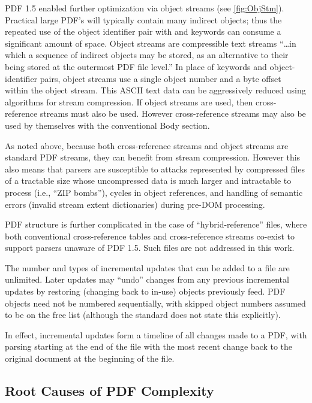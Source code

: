 PDF 1.5 enabled further optimization via object streams (see
\cref{fig:ObjStm}).
%
Practical large PDF's will typically contain many indirect objects;
%
thus the repeated use of the object identifier pair with 
and  keywords can consume a significant amount of space.
%
Object streams are compressible text streams ``\ldots in which a
sequence of indirect objects may be stored, as an alternative to their
being stored at the outermost PDF file level.''
%
In place of keywords and object-identifier pairs, object streams use a
single object number and a byte offset within the object stream.
%
This ASCII text data can be aggressively reduced using algorithms for
stream compression.
%
If object streams are used, then cross-reference streams must also be
used.
%
However cross-reference streams may also be used by themselves with
the conventional Body section.

As noted above, because both cross-reference streams and object
streams are standard PDF streams, they can benefit from stream
compression. However this also means that parsers are susceptible to
attacks represented by compressed files of a tractable size whose
uncompressed data is much larger and intractable to process (i.e.,
``ZIP bombs''), cycles in object references, and handling of semantic
errors (invalid stream extent dictionaries) during pre-DOM processing.

PDF structure is further complicated in the case of
``hybrid-reference'' files, where both conventional cross-reference
tables and cross-reference streams co-exist to support parsers unaware
of PDF 1.5.
%
Such files are not addressed in this work.

The number and types of incremental updates that can be added to a
file are unlimited.
%
Later updates may ``undo'' changes from any previous incremental
updates by restoring (changing back to in-use) objects previously
feed.
%
PDF objects need not be numbered sequentially, with skipped object
numbers assumed to be on the free list (although the standard does not
state this explicitly).

In effect, incremental updates form a timeline of all changes made to
a PDF, with parsing starting at the end of the file with the most
recent change back to the original document at the beginning of the
file.

\subsection{Root Causes of PDF Complexity}
\label{sec:rootcause}

